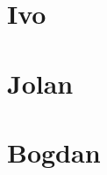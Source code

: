 \begin{appendices}
    \section{Ivo}
     \newpage

    \section{Jolan}
     \newpage
     
	\section{Bogdan}
	


    


\begin{comment} %
\chapter{Agenda} \label{a:agenda}
%
%
\end{comment}

\end{appendices}
